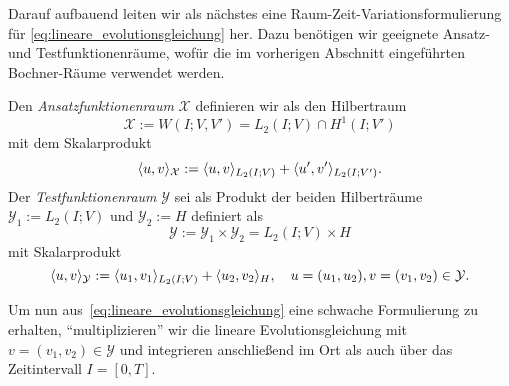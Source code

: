 \documentclass[../main.tex]{subfiles}
\begin{document}
Darauf aufbauend leiten wir als nächstes eine Raum-Zeit-Variationsformulierung für \cref{eq:lineare_evolutionsgleichung} her.
Dazu benötigen wir geeignete Ansatz- und Testfunktionenräume, wofür die im vorherigen Abschnitt eingeführten Bochner-Räume verwendet werden.

\begin{Definition}
\label{definition:ansatz_und_testraum}
    Den \emph{Ansatzfunktionenraum} $\mathcal X$ definieren wir als den Hilbertraum
    \begin{equation}
    \label{eq:ansatzraum_X}
        \mathcal X := W(I; V, V') = L_{2}(I; V) \cap H^{1}(I; V')
    \end{equation}
    mit dem Skalarprodukt
    \begin{equation}
    \label{eq:ansatzraum_skalarprodukt}
        \langle u,v\rangle_{\mathcal X} := \langle u,v\rangle_{L_{2}(I; V)} + \langle u',v'\rangle_{L_{2}(I; V')}.
    \end{equation}
    Der \emph{Testfunktionenraum} $\mathcal Y$ sei als Produkt der beiden Hilberträume $\mathcal Y_{1} := L_{2}(I; V)$ und $\mathcal Y_{2} := H$ definiert als
    \begin{equation}
    \label{eq:testraum_Y}
        \mathcal Y := \mathcal Y_{1} \times \mathcal Y_{2} = L_{2}(I; V) \times H
    \end{equation}
    mit Skalarprodukt
    \begin{equation}
        \label{eq:testraum_skalarprodukt}
        \langle u,v\rangle_{\mathcal Y} := \langle u_{1},v_{1}\rangle_{L_{2}(I; V)} + \langle u_{2},v_{2}\rangle_{H}, \quad  u = (u_{1}, u_{2}), v = (v_{1}, v_{2}) \in \mathcal Y.
    \end{equation}
\end{Definition}

Um nun aus~\cref{eq:lineare_evolutionsgleichung} eine schwache Formulierung zu erhalten, \enquote{multiplizieren} wir die lineare Evolutionsgleichung mit $v = (v_{1}, v_{2}) \in \mathcal Y$ und integrieren anschließend im Ort als auch über das Zeitintervall $I = [0, T]$.
\end{document}
